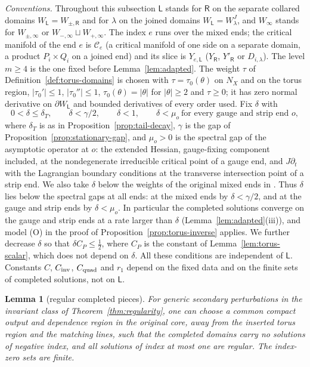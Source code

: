 \documentclass[11pt]{amsart}
\newtheorem{lemma}[theorem]{Lemma}
\theoremstyle{definition}
\theoremstyle{remark}
\theoremstyle{plain}
\numberwithin{equation}{section}
\begin{document}
\emph{Conventions.} Throughout this subsection $\mathsf L$ stands for $\mathsf R$ on the separate
collared domains $W_\mathsf L=W_{\pm,\mathsf R}$ and for $\lambda$ on the joined domains $W_\mathsf L=W^J_\lambda$,
and $W_\infty$ stands for $W_{\pm,\infty}$ or $W_{-,\infty}\sqcup W_{+,\infty}$. The index $e$ runs
over the mixed ends; the critical manifold of the end $e$ is $\mathcal C_e$ (a critical
manifold of one side on a separate domain, a product $P_i\times Q_i$ on a joined end) and its slice is $Y_{e,\mathsf L}$ ($Y_\mathsf R$,
$Y'_\mathsf R$ or $D_{i,\lambda}$). The level $m\ge4$ is the one fixed before
Lemma~\ref{lem:adapted}. The weight $\tau$ of
Definition~\ref{def:torus-domains} is chosen with $\tau=\tau_0(\theta)$ on $N_X$ and on the
torus region, $|\tau_0'|\le1$, $|\tau_0''|\le1$, $\tau_0(\theta)=|\theta|$ for $|\theta|\ge2$ and
$\tau\ge0$; it has zero normal derivative on $\partial W_\mathsf L$ and bounded derivatives of
every order used. Fix $\delta$ with
\[
0<\delta\le\delta_T,\qquad\delta<\gamma/2,\qquad\delta<1,\qquad\delta<\mu_o\ \text{for every gauge and strip end }o,
\]
where $\delta_T$ is as in Proposition~\ref{prop:tail-decay}, $\gamma$ is the gap of
Proposition~\ref{prop:stationary-gap}, and $\mu_o>0$ is the spectral gap of the asymptotic
operator at $o$: the extended Hessian, gauge-fixing component included, at the
nondegenerate irreducible critical point of a gauge end, and $J\partial_t$ with the Lagrangian
boundary conditions at the transverse intersection point of a strip end. We also take $\delta$
below the weights of the original mixed ends in \cite[Definition~3.9]{DFL}. Thus $\delta$ lies
below the spectral gaps at all ends: at the mixed ends by $\delta<\gamma/2$, and at the gauge and
strip ends by $\delta<\mu_o$. In particular the completed solutions converge on the gauge and
strip ends at a rate larger than $\delta$ (Lemma~\ref{lem:adapted}(iii)), and model (O) in the
proof of Proposition~\ref{prop:torus-inverse} applies. We further
decrease $\delta$ so that $\delta C_P\le\frac12$, where $C_P$ is the constant of
Lemma~\ref{lem:torus-scalar}, which does not depend on $\delta$. All these conditions are
independent of $\mathsf L$.
Constants $C$, $C_{\rm inv}$, $C_{\rm quad}$ and $r_1$ depend on
the fixed data and on the finite sets of completed solutions, not on $\mathsf L$.

\begin{lemma}[regular completed pieces]\label{lem:completed-regular}
For generic secondary perturbations in the invariant class of
Theorem~\ref{thm:regularity}, one can choose a common compact
output and dependence region in the original core, away from the
inserted torus region and the matching lines, such that the completed domains carry no solutions of negative index, and all
solutions of index at most one are regular. The index-zero sets are finite.
\end{lemma}
\end{document}
